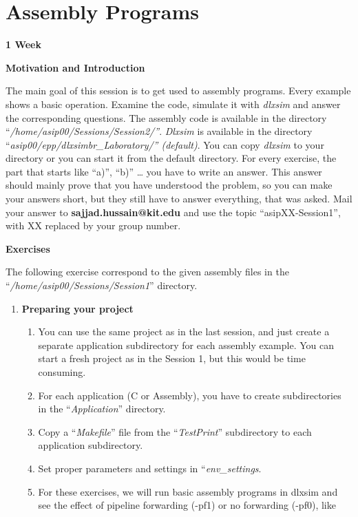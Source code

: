 \documentclass[
]{article}
\begin{document}
\hypertarget{assembly-programs}{%
\section{\texorpdfstring{Assembly
\textbf{Programs}}{Assembly Programs}}\label{assembly-programs}}

\textbf{{1 Week}}

\textbf{Motivation and Introduction}

The main goal of this session is to get used to assembly programs. Every
example shows a basic operation. Examine the code, simulate it with
\emph{dlxsim} and answer the corresponding questions. The assembly code
is available in the directory
``\emph{/home/asip00/Sessions/Session2/''}. \emph{Dlxsim} is available
in the directory
``\emph{asip00/}\emph{epp/dlxsimbr\_}\emph{Laboratory/'' (default)}. You
can copy \emph{dlxsim} to your directory or you can start it from the
default directory. For every exercise, the part that starts like ``a)'',
``b)'' \ldots{} you have to write an answer. This answer should mainly
prove that you have understood the problem, so you can make your answers
short, but they still have to answer everything, that was asked. Mail
your answer to \textbf{sajjad.hussain@kit.edu} and use the topic
``asipXX-Session1'', with XX replaced by your group number.

\textbf{Exercises}

The following exercise correspond to the given assembly files in the
``\emph{/home/asip00/Sessions/Session1}'' directory.

\begin{enumerate}
\def\labelenumi{\arabic{enumi}.}
\item
  \textbf{Preparing your project}

  \begin{enumerate}
  \def\labelenumii{\arabic{enumii}.}
  \item
    You can use the same project as in the last session, and just create
    a separate application subdirectory for each assembly example. You
    can start a fresh project as in the Session 1, but this would be
    time consuming.
  \item
    For each application (C or Assembly), you have to create
    subdirectories in the ``\emph{Application}'' directory.
  \item
    Copy a ``\emph{Makefile}'' file from the ``\emph{TestPrint}''
    subdirectory to each application subdirectory.
  \item
    Set proper parameters and settings in ``\emph{env\_settings}.
  \item
    For these exercises, we will run basic assembly programs in dlxsim
    and see the effect of pipeline forwarding (-pf1) or no forwarding
    (-pf0), like
  \end{enumerate}
\end{enumerate}
\end{document}
